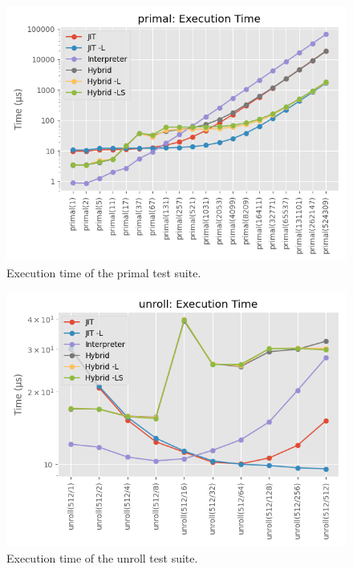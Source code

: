 \begin{figure}[H]
    \centering
    \includegraphics[scale=0.75]{output/graphs/tests/all/primal/time.png}
    \caption{Execution time of the primal test suite.}
    \label{figure:primal-time}
\end{figure}


\begin{figure}[H]
    \centering
    \includegraphics[scale=0.75]{output/graphs/tests/all/unroll/time.png}
    \caption{Execution time of the unroll test suite.}
    \label{figure:unroll-time}
\end{figure}